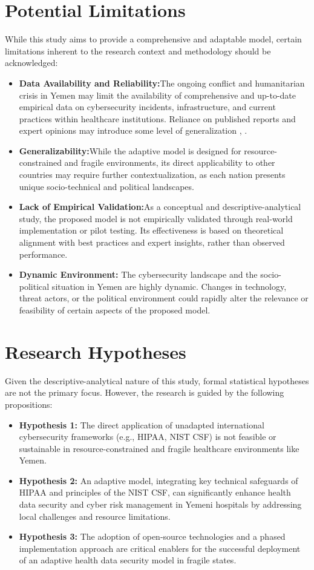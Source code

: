 \documentclass[12pt, a4paper, oneside]{report}
\begin{document}
	\section{Potential Limitations}
	While this study aims to provide a comprehensive and adaptable model, certain limitations inherent to the research context and methodology should be acknowledged:
	\begin{itemize}
		\item \textbf{ Data Availability and Reliability:}The ongoing conflict and humanitarian crisis in Yemen may limit the availability of comprehensive and up-to-date empirical data on cybersecurity incidents, infrastructure, and current practices within healthcare institutions. Reliance on published reports and expert opinions may introduce some level of generalization \cite{alhammadi2024advancing}, \cite{al2025political}.
		\item \textbf{ Generalizability:}While the adaptive model is designed for resource-constrained and fragile environments, its direct applicability to other countries may require further contextualization, as each nation presents unique socio-technical and political landscapes.
		\item \textbf{Lack of Empirical Validation:}As a conceptual and descriptive-analytical study, the proposed model is not empirically validated through real-world implementation or pilot testing. Its effectiveness is based on theoretical alignment with best practices and expert insights, rather than observed performance.
		\item \textbf{ Dynamic Environment:} The cybersecurity landscape and the socio-political situation in Yemen are highly dynamic. Changes in technology, threat actors, or the political environment could rapidly alter the relevance or feasibility of certain aspects of the proposed model.
	\end{itemize}
	\section{Research Hypotheses} Given the descriptive-analytical nature of this study, formal statistical hypotheses are not the primary focus. However, the research is guided by the following propositions:
	\begin{itemize} 
		\item \textbf{Hypothesis 1:} The direct application of unadapted international cybersecurity frameworks (e.g., HIPAA, NIST CSF) is not feasible or sustainable in resource-constrained and fragile healthcare environments like Yemen.
		\item \textbf{Hypothesis 2:} An adaptive model, integrating key technical safeguards of HIPAA and principles of the NIST CSF, can significantly enhance health data security and cyber risk management in Yemeni hospitals by addressing local challenges and resource limitations.
		\item \textbf{Hypothesis 3:} The adoption of open-source technologies and a phased implementation approach are critical enablers for the successful deployment of an adaptive health data security model in fragile states.
	\end{itemize}
	
\end{document}
